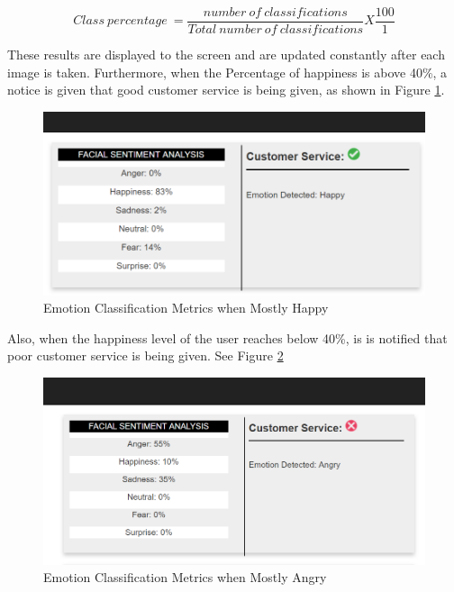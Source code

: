 \begin{equation}\label{eq:per}
Class\ percentage\ = 
\frac{
	number\ of\ classifications
}{
	Total\ number\ of\ classifications
}
X   
\frac{
	100
}{
	1
}
\end{equation}

These results are displayed to the screen and are updated constantly after each image is taken. Furthermore, when the Percentage of happiness is above 40\%, a notice is given that good customer service is being given, as shown in Figure \ref{good}.

\begin{figure}[ht]
	\begin{center}
		\advance\leftskip-3cm
		\advance\rightskip-3cm
		\includegraphics[keepaspectratio=true,scale=0.6]{__resources/implementation/good.png}
		\caption{Emotion Classification Metrics when Mostly Happy}
		\label{good}
	\end{center}
\end{figure}


Also, when the happiness level of the user reaches below 40\%, is is notified that poor customer service is being given. See Figure \ref{bad}

\begin{figure}[ht]
	\begin{center}
		\advance\leftskip-3cm
		\advance\rightskip-3cm
		\includegraphics[keepaspectratio=true,scale=0.6]{__resources/implementation/bad.png}
		\caption{Emotion Classification Metrics when Mostly Angry}
		\label{bad}
	\end{center}
\end{figure}
\newpage

